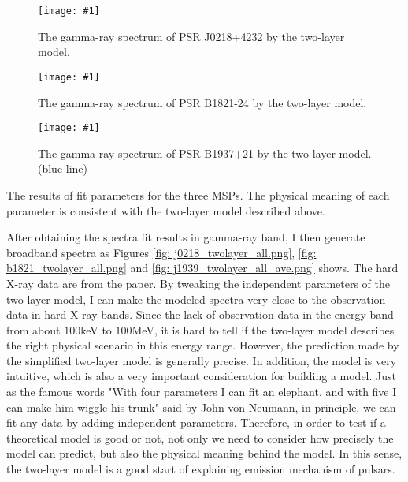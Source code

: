 \documentclass[12pt]{report}
\newcommand{\mycaption}[1]{\protect \caption{#1}}
\newcommand{\singleFig}[3]{
  \begin{figure}[!htp]
    \centering
    \texttt{[image: \#1]}
    \caption{#3}
    \label{fig: #1}
  \end{figure}
}
\newcommand{\change}[1]{
  $<$\colorbox{red}{\textbf{change}}$>$#1$<$\colorbox{red}{\textbf{/change}}$>$
}
\newcommand{\mayChange}[1]{
  $<$\colorbox{red}{\textbf{mayChange}}$>$#1$<$\colorbox{red}{\textbf{/mayChange}}$>$
}
\begin{document}
    \singleFig{j0218_twolayer_cur.png}{0.37}{The gamma-ray spectrum of PSR J0218+4232 by 
      the two-layer model.}
    \singleFig{b1821_twolayer_cur.png}{0.37}{The gamma-ray spectrum of PSR B1821-24 by 
      the two-layer model.}
    \singleFig{j1939_twolayer_cur.png}{0.38}{The gamma-ray spectrum of PSR B1937+21 by 
      the two-layer model. (blue line)}

        
    \begin{table}[!htp]
      \centering
      \mycaption{The results of fit parameters for the three MSPs. The physical 
        meaning of each parameter is consistent with the two-layer model described above.}
      \label{table: twolayer_fit_parameter}
    \end{table}
    \vspace{0.5cm}
          
    After obtaining the spectra fit results in gamma-ray band, I then generate broadband 
    spectra as Figures \ref{fig: j0218_twolayer_all.png}, \ref{fig: b1821_twolayer_all.png}
    and \ref{fig: j1939_twolayer_all_ave.png} shows. 
    The hard X-ray data are from the paper.\citep{0004-637X-845-2-159}
    By tweaking the independent parameters of the two-layer model, I can make the modeled spectra 
    very close to the observation data in hard X-ray bands. Since the lack of observation data in 
    the energy band from about $100$keV to $100$MeV, it is hard to tell if the two-layer model 
    describes the right physical scenario in this energy range. However, the prediction made 
    by the simplified two-layer model is generally precise. In addition, the model is very 
    intuitive, which is also a very important consideration for building a model. Just as 
    the famous words "With four parameters I can fit an elephant, and with five I 
    can make him wiggle his trunk" 
    said by John von Neumann, in principle, we can fit any data by adding independent 
    parameters. Therefore, in order to test if a theoretical model is good or not, not only we 
    need to consider how precisely the model can predict, but also the physical meaning 
    behind the model. In this sense, the two-layer model is a good start of explaining 
    emission mechanism of pulsars. 
      
\end{document}
